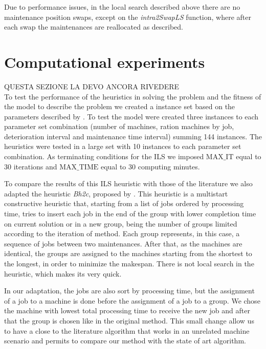\documentclass[a4paper,11pt]{article}
\newcommand{\rev}[1]{{\color{red} #1}}
\begin{document}
Due to performance issues, in the local search described above there are no maintenance position swaps, except on the \emph{intra2SwapLS} function, where after each swap the maintenances are reallocated as described. %

\section{Computational experiments} \label{sec:results}%

\rev{QUESTA SEZIONE LA DEVO ANCORA RIVEDERE}\\
To test the performance of the heuristics in solving the problem and the fitness of the model to describe the problem we created a instance set based on the parameters described by \cite{ruiz2017makespan}. To test the model were created three instances to each parameter set combination (number of machines, ration machines by job, deterioration interval and maintenance time interval) summing 144 instances. The heuristics were tested in a large set with 10 instances to each parameter set combination. As terminating conditions for the ILS we imposed $\text{MAX}\_\text{IT}$ equal to 30 iterations and $\text{MAX}\_\text{TIME}$ equal to $30$ computing minutes. 

To compare the results of this ILS heuristic with those of the literature  we also adapted the heuristic \emph{Bh2c}, proposed by \cite{ruiz2017makespan}. This heuristic is a multistart constructive heuristic that, starting from a list of jobs ordered by processing time, tries to insert each job in the end of the group with lower completion time on current solution or in a new group, being the number of groups limited according to the iteration of method. Each group represents, in this case, a sequence of jobs between two maintenances. After that, as the machines are identical, the groups are assigned to the machines starting from the shortest to the longest, in order to minimize the makespan. There is not local search in the heuristic, which makes its very quick. 

In our adaptation, the jobs are also sort by processing time, but the assignment of a job to a machine is done before the assignment of a job to a group. We chose the machine with lowest total processing time to receive the new job and after that the group is chosen like in the original method. This small change allow us to have a close to the literature algorithm that works in an unrelated machine scenario and permits to compare our method with the state of art algorithm.
\end{document}
